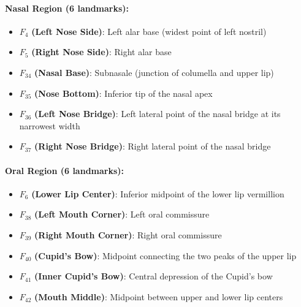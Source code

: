 \paragraph{Nasal Region (6 landmarks):}
\begin{itemize}
    \item $F_4$ \textbf{(Left Nose Side)}: Left alar base (widest point of left nostril)
    \item $F_5$ \textbf{(Right Nose Side)}: Right alar base
    \item $F_{34}$ \textbf{(Nasal Base)}: Subnasale (junction of columella and upper lip)
    \item $F_{35}$ \textbf{(Nose Bottom)}: Inferior tip of the nasal apex
    \item $F_{36}$ \textbf{(Left Nose Bridge)}: Left lateral point of the nasal bridge at its narrowest width
    \item $F_{37}$ \textbf{(Right Nose Bridge)}: Right lateral point of the nasal bridge
\end{itemize}

\paragraph{Oral Region (6 landmarks):}
\begin{itemize}
    \item $F_6$ \textbf{(Lower Lip Center)}: Inferior midpoint of the lower lip vermillion
    \item $F_{38}$ \textbf{(Left Mouth Corner)}: Left oral commissure
    \item $F_{39}$ \textbf{(Right Mouth Corner)}: Right oral commissure
    \item $F_{40}$ \textbf{(Cupid's Bow)}: Midpoint connecting the two peaks of the upper lip
    \item $F_{41}$ \textbf{(Inner Cupid's Bow)}: Central depression of the Cupid's bow
    \item $F_{42}$ \textbf{(Mouth Middle)}: Midpoint between upper and lower lip centers
\end{itemize}

